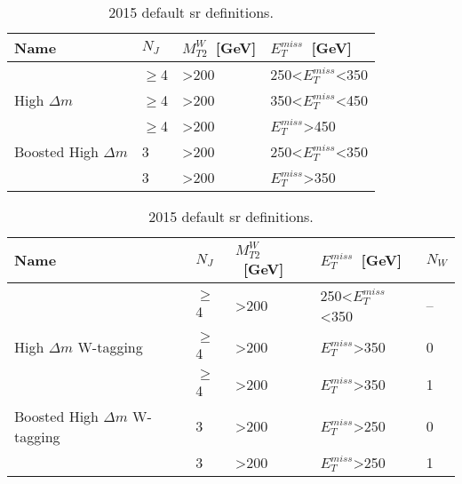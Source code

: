 \begin{table}[h]
\begin{center}
\begin{tabular}{|l|l|l|l|}
\hline
Name            & $N_{J}$  & $M_{T2}^{W}$~[GeV] & $E_{T}^{miss}$~[GeV]  \\
\hline
\hline
                & $\geq$4  & >200                & 250<$E_{T}^{miss}$<350   \\
High $\Delta m$ & $\geq$4  & >200                & 350<$E_{T}^{miss}$<450   \\
                & $\geq$4  & >200                & $E_{T}^{miss}$>450   \\
\hline
Boosted High $\Delta m$ & 3  & >200                & 250<$E_{T}^{miss}$<350   \\
                        & 3  & >200                & $E_{T}^{miss}$>350   \\
\hline
\end{tabular}
\caption[Table caption text]{2015 default sr definitions. }
\label{tab:SRnoW}
\end{center}
\end{table}

\begin{table}[h]
\begin{center}
\begin{tabular}{|l|l|l|l|l|}
\hline
Name            & $N_{J}$  & $M_{T2}^{W}$~[GeV]            & $E_{T}^{miss}$~[GeV]    & $N_{W}$ \\
\hline
\hline
                          & $\geq$4  & >200                & 250<$E_{T}^{miss}$<350   & --   \\
High $\Delta m$ W-tagging & $\geq$4  & >200                & $E_{T}^{miss}$>350       & 0    \\
                          & $\geq$4  & >200                & $E_{T}^{miss}$>350       & 1    \\
\hline
Boosted High $\Delta m$ W-tagging & 3  & >200              & $E_{T}^{miss}$>250 & 0  \\
                                  & 3  & >200              & $E_{T}^{miss}$>250 & 1  \\
\hline
\end{tabular}
\caption[Table caption text]{2015 default sr definitions. }
\label{tab:SRW}
\end{center}
\end{table}



